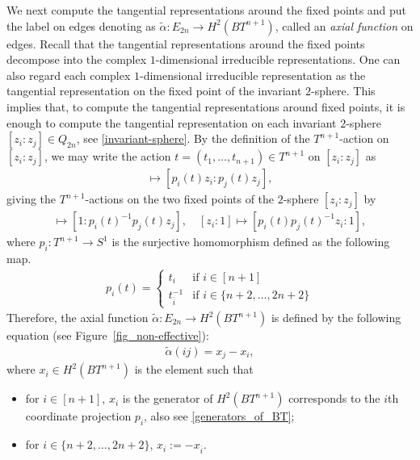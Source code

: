 \documentclass[12pt]{amsart}
\theoremstyle{remark}
\numberwithin{equation}{section}
\begin{document}
We next compute the tangential representations around the fixed points and put the label on edges denoting as $\widetilde{\alpha}:E_{2n}\to H^{2}(BT^{n+1})$, called an {\it axial function} on edges. 
Recall that the tangential representations around the fixed points decompose into the complex $1$-dimensional irreducible representations.
One can also regard each complex $1$-dimensional irreducible representation as the tangential representation on the fixed point of the invariant $2$-sphere.
This implies that, 
to compute the tangential representations around fixed points, 
it is enough to compute the tangential representation on each invariant $2$-sphere $[z_{i}:z_{j}]\in Q_{2n}$, see \eqref{invariant-sphere}.
By the definition of the $T^{n+1}$-action on $[z_{i}:z_{j}]$, 
we may write 
the action $t=(t_{1},\ldots, t_{n+1})\in T^{n+1}$ on $[z_{i}:z_{j}]$ as 
\begin{align*}
[z_{i}:z_{j}]\mapsto [p_{i}(t)z_{i}:p_{j}(t)z_{j}], 
\end{align*}
 giving 
the $T^{n+1}$-actions on the two fixed points of the $2$-sphere $[z_{i}:z_{j}]$ by 
\begin{align*}
[1:z_{j}]\mapsto [1:p_{i}(t)^{-1}p_{j}(t)z_{j}], \quad 
[z_{i}:1]\mapsto [p_{i}(t)p_{j}(t)^{-1}z_{i}:1],
\end{align*}
where $p_{i}:T^{n+1}\to S^{1}$ is the surjective homomorphism defined as the following map.
\begin{align*}
p_{i}(t)
=\left\{
\begin{array}{ll}
t_{i} & \text{if $i\in [n+1]$} \\
t_{\overline{i}}^{-1} & \text{if $i\in \{n+2,\ldots, 2n+2\}$}
\end{array}
\right.
\end{align*}
Therefore, the axial function $\widetilde{\alpha}:E_{2n}\to H^{2}(BT^{n+1})$ is defined by the following equation (see Figure~\ref{fig_non-effective}):
\begin{align}
\label{non-eff_axial_function}
\widetilde{\alpha}(ij)=x_{j}-x_{i},
\end{align}
where $x_{i}\in H^{2}(BT^{n+1})$ is the element such that 
\begin{itemize}
\item for $i\in [n+1]$, $x_{i}$ is the generator of $H^{2}(BT^{n+1})$ corresponds to the $i$th coordinate projection $p_{i}$, also see \eqref{generators_of_BT};
\item for $i\in \{n+2,\ldots, 2n+2\}$, $x_{i}:=-x_{\overline{i}}$.
\end{itemize}
\end{document}
